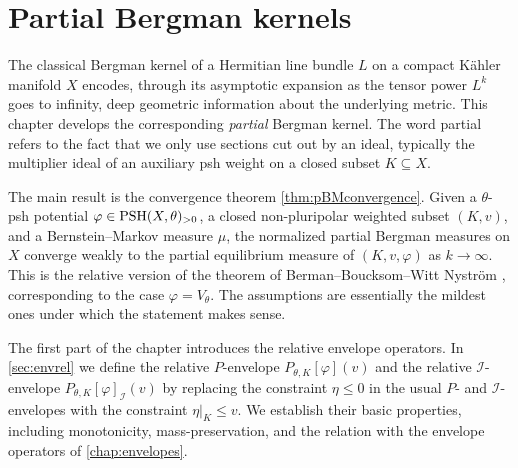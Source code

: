 \chapter{Partial Bergman kernels}
\label{chap:Bergman}

The classical Bergman kernel of a Hermitian line bundle $L$ on a compact Kähler manifold $X$ encodes, through its asymptotic expansion as the tensor power $L^k$ goes to infinity, deep geometric information about the underlying metric. This chapter develops the corresponding \emph{partial} Bergman kernel. The word partial refers to the fact that we only use sections cut out by an ideal, typically the multiplier ideal of an auxiliary psh weight on a closed subset $K\subseteq X$.

The main result is the convergence theorem \cref{thm:pBMconvergence}. Given a $\theta$-psh potential $\varphi\in \mathrm{PSH}(X,\theta)_{>0}$, a closed non-pluripolar weighted subset $(K,v)$, and a Bernstein--Markov measure $\mu$, the normalized partial Bergman measures on $X$ converge weakly to the partial equilibrium measure of $(K,v,\varphi)$ as $k\to\infty$. This is the relative version of the theorem of Berman--Boucksom--Witt Nystr\"om \cite{BBWN11}, corresponding to the case $\varphi=V_\theta$. The assumptions are essentially the mildest ones under which the statement makes sense.

The first part of the chapter introduces the relative envelope operators. In \cref{sec:envrel} we define the relative $P$-envelope $P_{\theta,K}[\varphi](v)$ and the relative $\mathcal{I}$-envelope $P_{\theta,K}[\varphi]_{\mathcal{I}}(v)$ by replacing the constraint $\eta\leq 0$ in the usual $P$- and $\mathcal{I}$-envelopes with the constraint $\eta|_K\leq v$. We establish their basic properties, including monotonicity, mass-preservation, and the relation with the envelope operators of \cref{chap:envelopes}.

